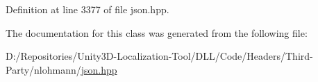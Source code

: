 Definition at line 3377 of file json.\+hpp.



The documentation for this class was generated from the following file\+:\begin{DoxyCompactItemize}
\item 
D\+:/\+Repositories/\+Unity3\+D-\/\+Localization-\/\+Tool/\+D\+L\+L/\+Code/\+Headers/\+Third-\/\+Party/nlohmann/\mbox{\hyperlink{json_8hpp}{json.\+hpp}}\end{DoxyCompactItemize}
